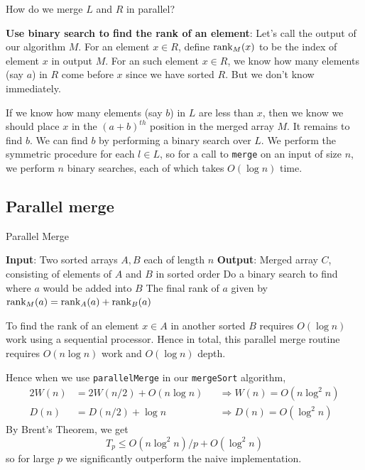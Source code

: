 \documentclass[11pt]{article}
\begin{document}
How do we merge \(L\) and \(R\) in parallel?

\textbf{Use binary search to find the rank of an element}: Let's call the output of our algorithm \(M\).
 For an element \(x\in R\), define \(\text{rank}_M(x)\) to be the index of element \(x\) in
 output \(M\). For an such element \(x\in R\), we know how many elements (say \(a\)) in \(R\) come
 before \(x\) since we have sorted \(R\). But we don't know immediately.

If we know how many elements (say \(b\)) in \(L\) are less than \(x\), then we know we should
place \(x\) in the \((a+b)^{th}\) position in the merged array \(M\). It remains to find \(b\).
We can find \(b\) by performing a binary search over \(L\). We perform the symmetric procedure
for each \(l\in L\), so for a call to \texttt{merge} on an input of size \(n\), we perform \(n\) binary
searches, each of which takes \(O(\log n)\) time.
\subsection{Parallel merge}
\label{sec:orgbb5e627}
\begin{algorithm}
\caption{Parallel Merge}
\begin{algorithmic}[1]
\State \textbf{Input}: Two sorted arrays \(A,B\) each of length \(n\)
\State \textbf{Output}: Merged array \(C\), consisting of elements of \(A\) and \(B\) in sorted order
    \State Do a binary search to find where \(a\) would be added into \(B\)
    \State The final rank of \(a\) given by \(\text{rank}_M(a)=\text{rank}_A(a)+\text{rank}_B(a)\)
\EndFor
\end{algorithmic}
\end{algorithm}

To find the rank of an element \(x\in A\) in another sorted \(B\) requires \(O(\log n)\) work
using a sequential processor. Hence in total, this parallel merge routine
requires \(O(n\log n)\) work and \(O(\log n)\) depth.

Hence when we use \texttt{parallelMerge} in our \texttt{mergeSort} algorithm,
\begin{alignat*}{2}
W(n)&=2W(n/2)+O(n\log n)&&\Rightarrow W(n)=O(n\log^2n)\\
D(n)&=D(n/2)+\log n&&\Rightarrow D(n)=O(\log^2n)
\end{alignat*}
By Brent's Theorem, we get
\begin{equation*}
T_p\le O(n\log^2n)/p+O(\log^2n)
\end{equation*}
so for large \(p\) we significantly outperform the naive implementation.
\end{document}
